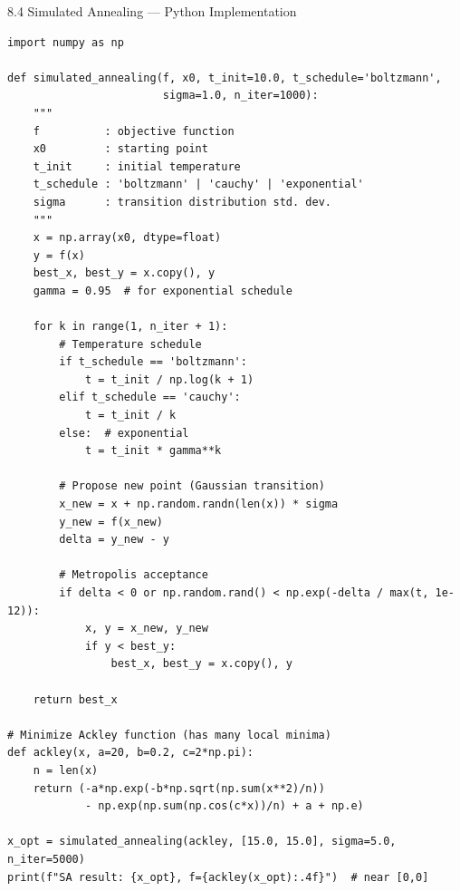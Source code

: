 \documentclass[aspectratio=169,10pt]{beamer}
\begin{document}
\begin{frame}[fragile]{8.4 Simulated Annealing --- Python Implementation}
\begin{lstlisting}[caption={Simulated annealing (Algorithm 8.6)}]
import numpy as np

def simulated_annealing(f, x0, t_init=10.0, t_schedule='boltzmann',
                        sigma=1.0, n_iter=1000):
    """
    f          : objective function
    x0         : starting point
    t_init     : initial temperature
    t_schedule : 'boltzmann' | 'cauchy' | 'exponential'
    sigma      : transition distribution std. dev.
    """
    x = np.array(x0, dtype=float)
    y = f(x)
    best_x, best_y = x.copy(), y
    gamma = 0.95  # for exponential schedule

    for k in range(1, n_iter + 1):
        # Temperature schedule
        if t_schedule == 'boltzmann':
            t = t_init / np.log(k + 1)
        elif t_schedule == 'cauchy':
            t = t_init / k
        else:  # exponential
            t = t_init * gamma**k

        # Propose new point (Gaussian transition)
        x_new = x + np.random.randn(len(x)) * sigma
        y_new = f(x_new)
        delta = y_new - y

        # Metropolis acceptance
        if delta < 0 or np.random.rand() < np.exp(-delta / max(t, 1e-12)):
            x, y = x_new, y_new
            if y < best_y:
                best_x, best_y = x.copy(), y

    return best_x

# Minimize Ackley function (has many local minima)
def ackley(x, a=20, b=0.2, c=2*np.pi):
    n = len(x)
    return (-a*np.exp(-b*np.sqrt(np.sum(x**2)/n))
            - np.exp(np.sum(np.cos(c*x))/n) + a + np.e)

x_opt = simulated_annealing(ackley, [15.0, 15.0], sigma=5.0, n_iter=5000)
print(f"SA result: {x_opt}, f={ackley(x_opt):.4f}")  # near [0,0]
\end{lstlisting}
\end{frame}
\end{document}
